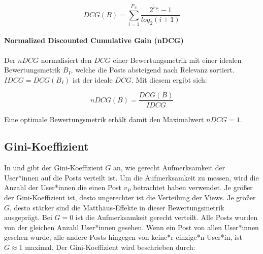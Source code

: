 \begin{equation}
\label{dcg}
DCG(B) = \sum_{i = 1}^{P_N}\frac{2^{{\tilde{r}}_{P_i}}-1}{log_2(i + 1)}
\end{equation} 

\paragraph{Normalized Discounted Cumulative Gain (nDCG)}

Der $nDCG$ normalisiert den $DCG$ einer Bewertungsmetrik mit einer idealen Bewertungsmetrik $B_I$, welche die Posts absteigend nach Relevanz sortiert. $IDCG = DCG(B_I)$ ist der ideale $DCG$. Mit diesem ergibt sich:

\begin{equation}
\label{ndcg}
nDCG(B) = \frac{DCG(B)}{IDCG} 
\end{equation}

Eine optimale Bewertungsmetrik erhält damit den Maximalwert $nDCG = 1$.







\subsection{Gini-Koeffizient}

In \cite{Lerman2014} und \cite{Salganik2006854} gibt der Gini-Koeffizient $G$ an, wie gerecht Aufmerksamkeit der User*innen auf die Posts verteilt ist.
Um die Aufmerksamkeit zu messen, wird die Anzahl der User*innen die einen Post $v_P$ betrachtet haben verwendet. Je größer der Gini-Koeffizient ist, desto ungerechter ist die Verteilung der Views. Je größer $G$, desto stärker sind die Matthäus-Effekte in dieser Bewertungsmetrik ausgeprägt.
Bei $G = 0$ ist die Aufmerksamkeit gerecht verteilt. Alle Posts wurden von der gleichen Anzahl User*innen gesehen. Wenn ein Post von allen User*innen gesehen wurde, alle andere Posts hingegen von keine*r einzige*n User*in, ist $G \approx 1$ maximal. Der Gini-Koeffizient wird beschrieben durch:

